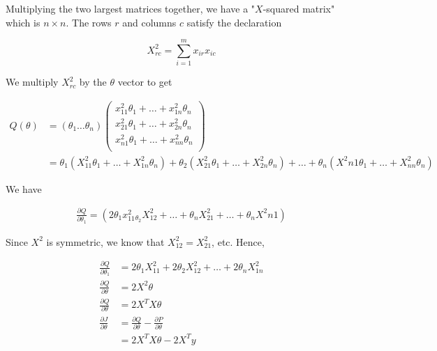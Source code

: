 \documentclass{article}
\begin{document}
        \noindent Multiplying the two largest matrices together, we have a "$X$-squared matrix" which is
        $n\times n$. The rows $r$ and columns $c$ satisfy the declaration

        \begin{equation*}
            X^2_{rc} = \sum^m_{i=1} x_{ir}x_{ic}
        \end{equation*}

        \noindent We multiply $X^2_{rc}$ by the $\theta$ vector to get

        \begin{align*}
            Q(\theta) &= (\theta_1\dots\theta_n)
            \begin{pmatrix}
                x^2_{11}\theta_1 + \dots + x^2_{1n}\theta_n \\
                x^2_{21}\theta_1 + \dots + x^2_{2n}\theta_n \\
                x^2_{n1}\theta_1 + \dots + x^2_{nn}\theta_n \\
            \end{pmatrix} \\
            &= \theta_1(X^2_{11}\theta_1+\dots+X^2_{1n}\theta_n) + \theta_2(X^2_{21}\theta_1+\dots+X^2_{2n}\theta_n)
            +\dots+\theta_n(X^2{n1}\theta_1+\dots+X^2_{nn}\theta_n)
        \end{align*}

        \noindent We have

        \begin{align*}
            \frac{\partial Q}{\partial \theta_1} = (2\theta_1 x^2_{11}_\theta_2 X^2_{12}+\dots+
            \theta_n X^2_{21}+\dots+\theta_n X^2{n1})
        \end{align*}

        \noindent Since $X^2$ is symmetric, we know that $X^2_{12} = X^2_{21}$, etc. Hence,

        \begin{align*}
            \frac{\partial Q}{\partial \theta_1} &= 2\theta_1 X^2_{11}+2\theta_2 X^2_{12}+\dots+2\theta_n X^2_{1n} \\
            \frac{\partial Q}{\partial \theta} &= 2X^2\theta \\
            \frac{\partial Q}{\partial \theta} &= 2X^T X\theta \\
            \frac{\partial J}{\partial \theta} &= \frac{\partial Q}{\partial\theta}-\frac{\partial P}{\partial\theta} \\
            &= 2X^T X\theta - 2X^T y
        \end{align*}
\end{document}
